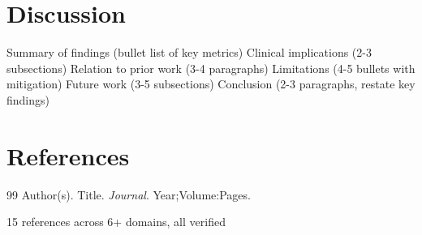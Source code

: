 \documentclass[12pt]{article}
\begin{document}
\section{Discussion}
  Summary of findings (bullet list of key metrics)
  Clinical implications (2-3 subsections)
  Relation to prior work (3-4 paragraphs)
  Limitations (4-5 bullets with mitigation)
  Future work (3-5 subsections)
  Conclusion (2-3 paragraphs, restate key findings)

\section{References}
  \begin{thebibliography}{99}
     Author(s). Title. \textit{Journal}. Year;Volume:Pages.
  \end{thebibliography}
  15 references across 6+ domains, all verified
\end{document}
